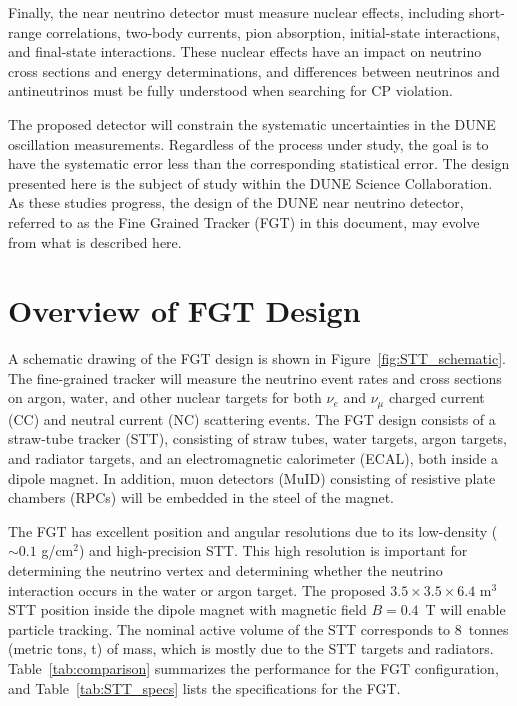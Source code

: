 Finally, the near neutrino detector must measure nuclear effects, including
short-range correlations, two-body currents, pion absorption, initial-state interactions, 
and final-state interactions. These nuclear effects 
have an impact on neutrino cross sections and energy determinations, and differences
between neutrinos and antineutrinos must be fully understood when searching
for CP violation.

The proposed detector will constrain the systematic uncertainties in the DUNE 
oscillation measurements. Regardless of the process under study, the goal is
to have the systematic error less than the corresponding statistical error. 
The design presented here is the subject of study within the DUNE Science 
Collaboration. As these studies 
progress, the design of the DUNE near neutrino detector, 
referred to as the Fine Grained Tracker (FGT) in this document, may 
evolve from what is described here. 

\section{Overview of FGT Design}
\label{sec:nd-nnd-fgt}

A schematic drawing of the 
FGT design is shown in Figure~\ref{fig:STT_schematic}. 
The fine-grained tracker %
will measure the neutrino event rates and cross sections 
on argon, water, and other nuclear 
targets for both $\nu_e$ and $\nu_\mu$ charged current (CC) and
neutral current (NC) scattering events. The FGT design 
consists of a straw-tube tracker (STT), consisting of straw tubes, water targets, argon targets, 
and radiator targets, and an electromagnetic calorimeter (ECAL), both inside a
dipole magnet. In addition, muon detectors (MuID) consisting of resistive plate
chambers (RPCs) will be embedded in the steel
of the magnet. 

The FGT has excellent position and angular resolutions due to
its low-density ($\sim0.1$ g/cm$^2$) and high-precision STT. This high 
resolution is important for determining the neutrino
vertex and determining whether the neutrino interaction occurs in the water
or argon target.  The
proposed $3.5\times3.5\times6.4$ m$^3$ STT position inside the 
dipole magnet with magnetic field $B = 0.4$~T will enable particle tracking. %
The nominal active volume of the STT corresponds to 8~tonnes (metric tons, t) of mass, 
which is mostly due to the STT targets and radiators. 
Table~\ref{tab:comparison} summarizes the
performance for the FGT configuration, and
Table~\ref{tab:STT_specs} lists the specifications for the FGT. %

